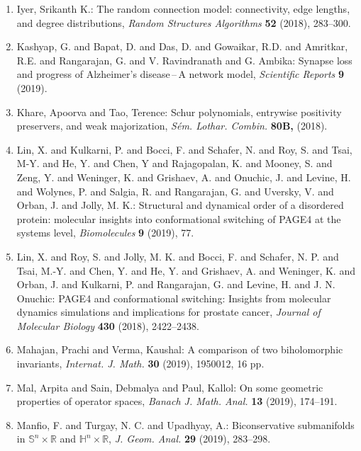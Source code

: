 \begin{enumerate}[leftmargin=27pt]
	\item\label{iyer:connection-model} Iyer, Srikanth K.: The random connection model: connectivity, edge lengths,
	      and degree distributions, {\em Random Structures Algorithms} {\bf 52} (2018), 283--300.

	\item Kashyap, G. and Bapat, D. and Das, D. and Gowaikar, R.D. and  Amritkar, R.E. and Rangarajan, G. and V. Ravindranath and G. Ambika: Synapse loss and progress of Alzheimer's disease\,--\,A network model,
	      {\em Scientific Reports} {\bf 9} (2019).

	\item Khare, Apoorva and Tao, Terence: Schur polynomials, entrywise positivity preservers, and weak
	      majorization, {\em S\'em. Lothar. Combin.} {\bf 80B,} (2018).

	\item Lin, X. and Kulkarni, P. and Bocci, F. and Schafer, N. and Roy, S. and Tsai, M-Y. and He, Y. and Chen, Y and Rajagopalan, K. and Mooney, S. and Zeng, Y. and Weninger, K. and Grishaev, A. and Onuchic, J. and Levine, H. and Wolynes, P. and Salgia, R. and Rangarajan, G. and Uversky, V. and Orban, J. and Jolly, M. K.: Structural and
	      dynamical order of a disordered protein: molecular insights into conformational
	      switching of PAGE4 at the systems level, {\em Biomolecules} {\bf 9} (2019), 77.

	\item\label{rangarajan:prostate-cancer} Lin, X. and Roy, S. and Jolly, M. K. and Bocci, F. and Schafer, N. P. and Tsai, M.-Y. and Chen, Y. and He, Y. and Grishaev, A. and Weninger, K. and Orban, J. and Kulkarni, P. and Rangarajan, G. and Levine, H. and J. N. Onuchic: PAGE4 and conformational switching: Insights from molecular dynamics simulations and implications for
	      prostate cancer, {\em Journal of Molecular Biology} {\bf 430} (2018), 2422--2438.

	\item Mahajan, Prachi and Verma, Kaushal: A comparison of two biholomorphic invariants, {\em Internat. J. Math.} {\bf 30} (2019), 1950012, 16 pp.

	\item Mal, Arpita and Sain, Debmalya and Paul, Kallol: On some geometric properties of operator spaces, {\em Banach J. Math. Anal.} {\bf 13} (2019), 174--191.

	\item Manfio, F. and Turgay, N. C. and Upadhyay, A.: Biconservative submanifolds in
		      {$\mathbb{S}^n\times\mathbb{R}$} and
		      {$\mathbb{H}^n\times\mathbb{R}$}, {\em J. Geom. Anal.} {\bf 29} (2019), 283--298.


\end{enumerate}
